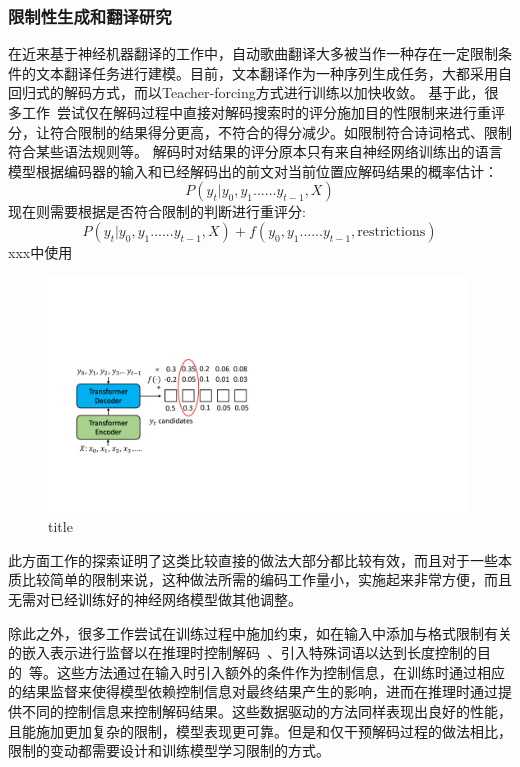 \subsubsection{限制性生成和翻译研究}
在近来基于神经机器翻译的工作\citep{gagast}中，自动歌曲翻译大多被当作一种存在一定限制条件的文本翻译任务进行建模。目前，文本翻译作为一种序列生成任务，大都采用自回归式的解码方式，而以Teacher-forcing方式进行训练以加快收敛。
基于此，很多工作~\citep{hokamp-liu-2017-lexically,lakew-etal-2019-controlling,li-etal-2020-rigid,zou_controllable}尝试仅在解码过程中直接对解码搜索时的评分施加目的性限制来进行重评分，让符合限制的结果得分更高，不符合的得分减少。如限制符合诗词格式、限制符合某些语法规则等。
解码时对结果的评分原本只有来自神经网络训练出的语言模型根据编码器的输入和已经解码出的前文对当前位置应解码结果的概率估计：
\begin{equation}
  P(y_t|y_0,y_1......y_{t-1}, X)
\end{equation}
现在则需要根据是否符合限制的判断进行重评分:
\begin{equation}
  P(y_t|y_0,y_1......y_{t-1}, X)+f(y_0,y_1......y_{t-1}, \mbox{restrictions})
\end{equation}
xxx中使用
\begin{figure}[htbp]
  \includegraphics[width=0.99\textwidth]{figure/related/decoded_constrain.pdf}
  \caption{title}
\end{figure}
此方面工作的探索证明了这类比较直接的做法大部分都比较有效，而且对于一些本质比较简单的限制来说，这种做法所需的编码工作量小，实施起来非常方便，而且无需对已经训练好的神经网络模型做其他调整。

除此之外，很多工作尝试在训练过程中施加约束，如在输入中添加与格式限制有关的嵌入表示进行监督以在推理时控制解码~\citep{li-etal-2020-rigid}、引入特殊词语以达到长度控制的目的~\citep{lakew-etal-2019-controlling,saboo-baumann-2019-integration}等。这些方法通过在输入时引入额外的条件作为控制信息，在训练时通过相应的结果监督来使得模型依赖控制信息对最终结果产生的影响，进而在推理时通过提供不同的控制信息来控制解码结果。这些数据驱动的方法同样表现出良好的性能，且能施加更加复杂的限制，模型表现更可靠。但是和仅干预解码过程的做法相比，限制的变动都需要设计和训练模型学习限制的方式。
